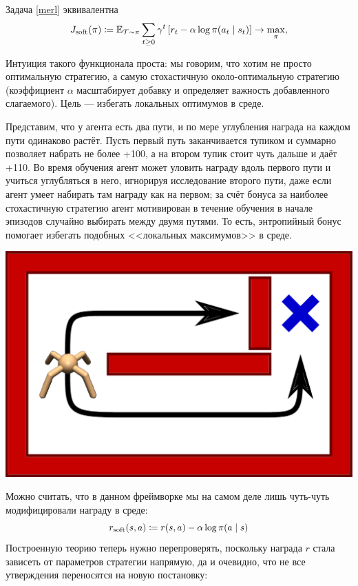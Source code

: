 \begin{proposition}
Задача \eqref{merl} эквивалентна
\begin{equation*}
    J_{\mathrm{soft}}(\pi) \coloneqq \mathbb{E}_{\mathcal{T} \sim \pi} \sum_{t \ge 0} \gamma^t \left[ r_t - \alpha \log \pi(a_t \mid s_t) \right] \to \max_\pi,
\end{equation*}
\end{proposition}

Интуиция такого функционала проста: мы говорим, что хотим не просто оптимальную стратегию, а самую стохастичную около-оптимальную стратегию (коэффициент $\alpha$ масштабирует добавку и определяет важность добавленного слагаемого). Цель --- избегать локальных оптимумов в среде. 

\begin{exampleBox}[righthand ratio=0.3, sidebyside, sidebyside align=center, lower separated=false]{}
Представим, что у агента есть два пути, и по мере углубления награда на каждом пути одинаково растёт. Пусть первый путь заканчивается тупиком и суммарно позволяет набрать не более +100, а на втором тупик стоит чуть дальше и даёт +110. Во время обучения агент может уловить награду вдоль первого пути и учиться углубляться в него, игнорируя исследование второго пути, даже если агент умеет набирать там награду как на первом; за счёт бонуса за наиболее стохастичную стратегию агент мотивирован в течение обучения в начале эпизодов случайно выбирать между двумя путями. То есть, энтропийный бонус помогает избегать подобных <<локальных максимумов>> в среде.

\tcblower
\includegraphics[width=\textwidth]{Images/twopaths.png}
\end{exampleBox}

Можно считать, что в данном фреймворке мы на самом деле лишь чуть-чуть модифицировали награду в среде:
\begin{equation}\label{softreward}
r_{\mathrm{soft}}(s, a) \coloneqq r(s, a) - \alpha \log \pi(a \mid s)
\end{equation}
Построенную теорию теперь нужно перепроверять, поскольку награда $r$ стала зависеть от параметров стратегии напрямую, да и очевидно, что не все утверждения переносятся на новую постановку:

